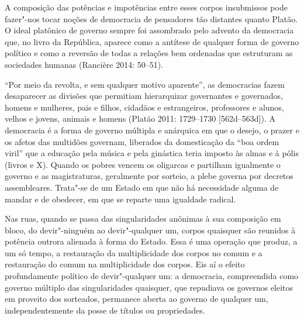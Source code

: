 A composição das potências e impotências entre esses corpos insubmissos
pode fazer"-nos tocar noções de democracia de pensadores tão distantes
quanto Platão. O ideal platônico de governo sempre foi assombrado pelo
advento da democracia que, no livro  da República, aparece como a
antítese de qualquer forma de governo político e como a reversão de
todas a relações bem ordenadas que estruturam as sociedades humanas
(Rancière 2014: 50--51).

``Por meio da revolta, e sem qualquer motivo aparente'', as democracias
fazem desaparecer as divisões que permitiam hierarquizar governantes e
governados, homens e mulheres, pais e filhos, cidadãos e estrangeiros,
professores e alunos, velhos e jovens, animais e homens (Platão 2011:
1729--1730 {[}562d--563d{]}). A democracia é a forma de governo múltipla e
anárquica em que o desejo, o prazer e os afetos das multidões governam,
liberados da domesticação da ``boa ordem viril'' que a educação pela
música e pela ginástica teria imposto às almas e à pólis (livros  e
X). Quando os pobres vencem os oligarcas e partilham igualmente o
governo e as magistraturas, geralmente por sorteio, a plebe governa por
decretos assembleares. Trata"-se de um Estado em que não há necessidade
alguma de mandar e de obedecer, em que se reparte uma igualdade radical.

Nas ruas, quando se passa das singularidades anônimas à sua composição
em bloco, do devir"-ninguém ao devir"-qualquer um, corpos quaisquer são
reunidos à potência outrora alienada à forma do Estado. Essa é uma
operação que produz, a um só tempo, a restauração da multiplicidade dos
corpos no comum e a restauração do comum na multiplicidade dos corpos. Eis
aí o efeito profundamente político de devir"-qualquer um: a democracia,
compreendida como governo múltiplo das singularidades quaisquer, que
repudiava os governos eleitos em proveito dos sorteados, permanece
aberta ao governo de qualquer um, independentemente da posse de títulos
ou propriedades.

